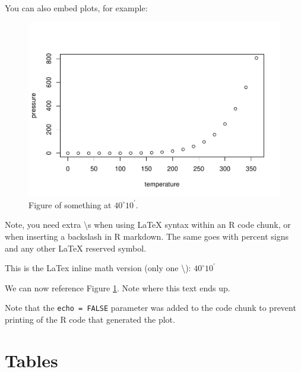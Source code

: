 \documentclass[12pt,]{article}
\begin{document}
You can also embed plots, for example:

\begin{figure}[htbp]
\centering
\includegraphics{4-Workshop_examples_files/figure-latex/pressure-1.pdf}
\caption{Figure of something at \(40^\circ 10^\prime\).
\label{fig:pressure}}
\end{figure}

Note, you need extra \textbackslash{}s when using LaTeX syntax within an
R code chunk, or when inserting a backslash in R markdown. The same goes
with percent signs and any other LaTeX reserved symbol.

This is the LaTex inline math version (only one \textbackslash{}):
\(40^\circ 10^\prime\)

\FloatBarrier

We can now reference Figure \ref{fig:pressure}. Note where this text
ends up.

Note that the \texttt{echo = FALSE} parameter was added to the code
chunk to prevent printing of the R code that generated the plot.

\section{Tables}\label{tables}

\begin{table}[ht]
\centering
\caption{This is where you write your caption} 
\label{tab:Table_example}
\end{table}
\end{document}
